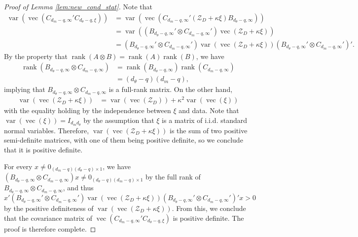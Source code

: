 \documentclass[11pt]{article}
\theoremstyle{definition}
\DeclareMathOperator*{\rank}{rank}
\DeclareMathOperator{\var}{var}
\newcommand{\0}{\ensuremath{\mathbf{0}}}
\begin{document}
\begin{bibunit}
\begin{proof}[Proof of Lemma \ref{lem:new_cond_stat}]
	Note that 
	\begin{align*}
		\var(\operatorname*{vec}(C_{d_m-q,\infty}'C_{d_\theta - q, \xi}))
		&= \var(\operatorname*{vec}(C_{d_m-q,\infty}'(\mathcal{Z}_D + \kappa\xi)B_{d_\theta - q, \infty})) \\
		&= \var\left((B_{d_\theta - q, \infty}' \otimes C_{d_m-q,\infty}')\operatorname*{vec}(\mathcal{Z}_D + \kappa\xi)\right) \\
		&= (B_{d_\theta - q, \infty}' \otimes C_{d_m-q,\infty}') \var\left(\operatorname*{vec}(\mathcal{Z}_D + \kappa\xi)\right) (B_{d_\theta - q, \infty}' \otimes C_{d_m-q,\infty}')'.
	\end{align*}
	By the property that $\rank(A\otimes B) = \rank(A)\rank(B)$, we have 
	\begin{align*}
		\rank(B_{d_\theta - q, \infty} \otimes C_{d_m-q,\infty}) 
		&= \rank(B_{d_\theta - q, \infty}) \rank(C_{d_m-q,\infty})  \\
		&= (d_\theta - q)(d_m - q),
	\end{align*}
	implying that $B_{d_\theta - q, \infty} \otimes C_{d_m-q,\infty}$ is a full-rank matrix. 
	On the other hand, 
	\begin{align*}
		\var\left(\operatorname*{vec}(\mathcal{Z}_D + \kappa \xi)\right)
		&= \var\left(\operatorname*{vec}(\mathcal{Z}_D)\right) + \kappa^2 \var\left(\operatorname*{vec}(\xi)\right)
	\end{align*}
	with the equality holding by the independence between $\xi$ and data. Note that $\var(\operatorname*{vec}(\xi)) = I_{d_md_\theta}$ by the assumption that $\xi$ is a matrix of i.i.d. standard normal variables.  Therefore, $\var\left(\operatorname*{vec}(\mathcal{Z}_D + \kappa\xi)\right)$ is the sum of two positive semi-definite matrices, with one of them being positive definite, so we conclude that it is positive definite.

	For every $x \neq 0_{(d_m-q)(d_\theta - q)\times 1}$, we have $(B_{d_\theta - q, \infty} \otimes C_{d_m-q,\infty})x \neq 0_{(d_\theta-q)(d_m-q)\times 1}$ by the full rank of $B_{d_\theta - q, \infty} \otimes C_{d_m-q,\infty}$, and thus 
	\[
		x'(B_{d_\theta - q, \infty}' \otimes C_{d_m-q,\infty}') \var(\operatorname*{vec}(\mathcal{Z}_D + \kappa\xi)) (B_{d_\theta - q, \infty}' \otimes C_{d_m-q,\infty}')'x > 0
	\]
	by the positive definiteness of $\var(\operatorname*{vec}(\mathcal{Z}_D + \kappa\xi))$. From this, we conclude that the covariance matrix of $\operatorname{vec}(C_{d_m-q,\infty}'C_{d_\theta - q, \xi})$ is positive definite. The proof is therefore complete.
\end{proof}



\end{bibunit}
\end{document}
